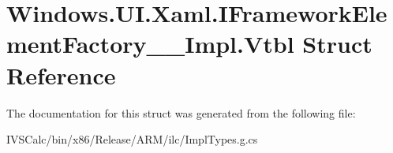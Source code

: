 \hypertarget{struct_windows_1_1_u_i_1_1_xaml_1_1_i_framework_element_factory_____impl_1_1_vtbl}{}\section{Windows.\+U\+I.\+Xaml.\+I\+Framework\+Element\+Factory\+\_\+\+\_\+\+Impl.\+Vtbl Struct Reference}
\label{struct_windows_1_1_u_i_1_1_xaml_1_1_i_framework_element_factory_____impl_1_1_vtbl}


The documentation for this struct was generated from the following file\+:\begin{DoxyCompactItemize}
\item 
I\+V\+S\+Calc/bin/x86/\+Release/\+A\+R\+M/ilc/Impl\+Types.\+g.\+cs\end{DoxyCompactItemize}
